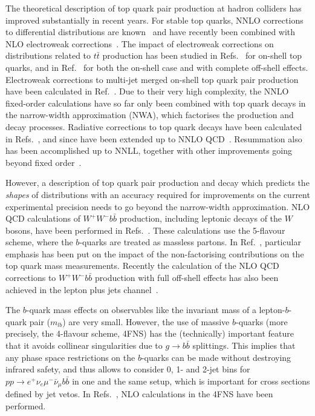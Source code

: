 The theoretical description of top quark pair production at hadron
colliders has improved substantially in recent years.
For stable top quarks, NNLO corrections to differential distributions are
known~\cite{Czakon:2015owf,Czakon:2016dgf,Czakon:2017dip} and have recently 
been combined with
NLO electroweak corrections~\cite{Czakon:2017wor}.
The impact of electroweak corrections on distributions related to
$t\bar{t}$ production has been studied in
Refs.~\cite{Hollik:2011ps,Kuhn:2013zoa,Pagani:2016caq} for on-shell top quarks, and
in Ref.~\cite{Denner:2016jyo} for both the on-shell case and with complete
off-shell effects. Electroweak corrections to multi-jet merged
on-shell top quark pair production have been calculated in Ref.~\cite{Gutschow:2018tuk}.
Due to their very high complexity, the NNLO fixed-order calculations have so far only
been combined with top quark decays in the narrow-width approximation
(NWA), which factorises the production and decay processes.
Radiative corrections to top quark decays have been calculated in
Refs.~\cite{Bernreuther:2004jv,Melnikov:2009dn,Campbell:2012uf}, and
since have been extended up to NNLO QCD~\cite{Brucherseifer:2013iv,Gao:2017goi}.
Resummation also has been accomplished up to NNLL, together with other
improvements going beyond fixed
order~\cite{Beneke:2011mq,Cacciari:2011hy,Ferroglia:2013awa,Broggio:2014yca,Kidonakis:2015dla,Pecjak:2016nee}. 


However, a description of top quark pair production and decay which
predicts the {\em shapes} of distributions with an accuracy required for
improvements on the current experimental precision needs to go beyond the
narrow-width approximation.
NLO QCD calculations of $W^+W^- b\bar{b}$ production, including leptonic
decays of the $W$ bosons,  have been performed in
Refs.~\cite{Denner:2010jp,Denner:2012yc,Bevilacqua:2010qb,Heinrich:2013qaa}. 
These calculations use the 5-flavour scheme, where
the $b$-quarks are treated as massless partons.
In Ref.~\cite{Heinrich:2013qaa}, particular emphasis has been put on the
impact of the non-factorising contributions on the top quark mass
measurements. 
Recently the calculation of the NLO QCD corrections to $W^+W^- b\bar{b}$ production with
full off-shell effects has also been achieved in the lepton plus jets channel~\cite{Denner:2017kzu}.

The $b$-quark mass effects on observables like the invariant mass of a
lepton-$b$-quark pair  ($m_{lb}$)  are very small. 
However, the use of 
massive $b$-quarks (more precisely, the 4-flavour scheme, 4FNS)  has the
(technically) important feature that it avoids collinear singularities
due to $g\to b\bar{b}$ splittings. This implies that any phase space restrictions on
the $b$-quarks can be made without destroying infrared safety, and
thus allows  to consider 0, 1- and 2-jet bins for 
$pp\to e^+\nu_e\mu^-\bar{\nu}_\mu b\bar{b}$ in one and the same setup, 
which is important for cross sections defined by jet vetos.
In Refs.~\cite{Frederix:2013gra,Cascioli:2013wga}, NLO calculations in the 4FNS have been performed.

